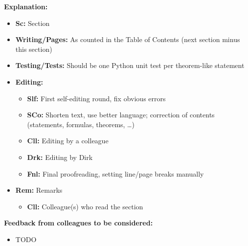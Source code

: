 \noindent
\textbf{Explanation:}

\begin{itemize}
  \item
  \textbf{Sc:}
  Section
  
  \item
  \textbf{Writing/Pages:}
  As counted in the Table of Contents
  (next section minus this section)
  
  \item
  \textbf{Testing/Tests:}
  Should be one Python unit test per theorem-like statement
  
  \item
  \textbf{Editing:}
  \begin{itemize}
    \item
    \textbf{Slf:}
    First self-editing round, fix obvious errors
    
    \item
    \textbf{SCo:}
    Shorten text, use better language;
    correction of contents (statements, formulas, theorems, \dots)
    
    \item
    \textbf{Cll:}
    Editing by a colleague
    
    \item
    \textbf{Drk:}
    Editing by Dirk
    
    \item
    \textbf{Fnl:}
    Final proofreading, setting line/page breaks manually
  \end{itemize}
  
  \item
  \textbf{Rem:}
  Remarks
  \begin{itemize}
    \item
    \textbf{Cll:}
    Colleague(s) who read the section
  \end{itemize}
\end{itemize}

\noindent
\textbf{Feedback from colleagues to be considered:}

\begin{itemize}
  \item
  TODO
\end{itemize}

\cleardoublepage
